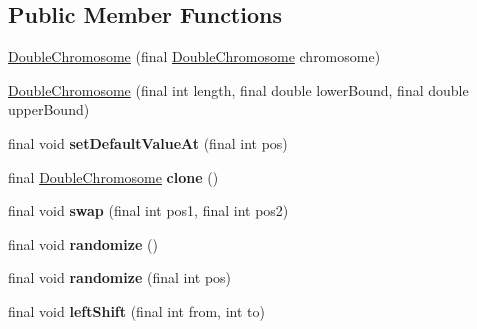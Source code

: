 \subsection*{Public Member Functions}
\begin{DoxyCompactItemize}
\item 
\hyperlink{classjenes_1_1chromosome_1_1_double_chromosome_a849079d41a2f10db681ba24de10d2619}{Double\-Chromosome} (final \hyperlink{classjenes_1_1chromosome_1_1_double_chromosome}{Double\-Chromosome} chromosome)
\item 
\hyperlink{classjenes_1_1chromosome_1_1_double_chromosome_a7166da8f71e5b0cf37e751c053f6ff5f}{Double\-Chromosome} (final int length, final double lower\-Bound, final double upper\-Bound)
\item 
\hypertarget{classjenes_1_1chromosome_1_1_double_chromosome_a82130d84dadedda332121b92f801d2e6}{final void {\bfseries set\-Default\-Value\-At} (final int pos)}\label{classjenes_1_1chromosome_1_1_double_chromosome_a82130d84dadedda332121b92f801d2e6}

\item 
\hypertarget{classjenes_1_1chromosome_1_1_double_chromosome_ac471f6b6cb7989e6b90c5e70e7b8a9a2}{final \hyperlink{classjenes_1_1chromosome_1_1_double_chromosome}{Double\-Chromosome} {\bfseries clone} ()}\label{classjenes_1_1chromosome_1_1_double_chromosome_ac471f6b6cb7989e6b90c5e70e7b8a9a2}

\item 
\hypertarget{classjenes_1_1chromosome_1_1_double_chromosome_ac34343c04259b0e3da8a7b2579cbd5fc}{final void {\bfseries swap} (final int pos1, final int pos2)}\label{classjenes_1_1chromosome_1_1_double_chromosome_ac34343c04259b0e3da8a7b2579cbd5fc}

\item 
\hypertarget{classjenes_1_1chromosome_1_1_double_chromosome_a1ecf9f1d70333b8cbabdba918946cdfc}{final void {\bfseries randomize} ()}\label{classjenes_1_1chromosome_1_1_double_chromosome_a1ecf9f1d70333b8cbabdba918946cdfc}

\item 
\hypertarget{classjenes_1_1chromosome_1_1_double_chromosome_a370f8d51fa8635eeadf925e2faf11991}{final void {\bfseries randomize} (final int pos)}\label{classjenes_1_1chromosome_1_1_double_chromosome_a370f8d51fa8635eeadf925e2faf11991}

\item 
\hypertarget{classjenes_1_1chromosome_1_1_double_chromosome_a8d8eb8ce2b20abad8d462ae87a213e85}{final void {\bfseries left\-Shift} (final int from, int to)}\label{classjenes_1_1chromosome_1_1_double_chromosome_a8d8eb8ce2b20abad8d462ae87a213e85}


\end{DoxyCompactItemize}
